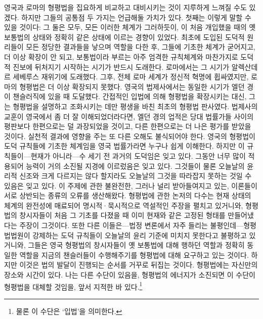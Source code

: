 영국과 로마의 형평법을 집요하게 비교하고 대비시키는 것이 지루하게 느껴질 수도
있겠다. 하지만 그들의 공통점 두 가지는 언급해둘 가치가 있다.
첫째는 이렇게 말할 수 있을 것이다:
그 둘은 모두, 모든 이러한 체계가 그러하듯이,
이 처음 개입했을 때의 옛 보통법의 상태와 정확히 같은 상태에
이르는 경향이 있었다.
최초에 도입된 도덕적 원리들이 모든 정당한 결과들을 낳으며 역할을 다한 후,
그들에 기초한 체계가 굳어지고, 더 이상 확장이 안 되고,
보통법이라 부르는 아주 엄격한 규칙체계와 마찬가지로
도덕적 진보에 뒤처지기 시작하는
시기가 반드시 도래한다.
로마에서는 그 시기가 알렉산데르 세베루스 재위기에 도래했다.
그후, 전체 로마 세계가 정신적 혁명에 휩싸였지만, 로마의 형평법은
더 이상 확장되지 못했다.
영국의 법제사에서는 동일한 시기가 엘던 경이
챈슬러직에 있을 때 도달했다.
간접적인 입법에 의해 형평법을 확장시키는 대신, 그는
형평법을 설명하고 조화시키는 데만 평생을 바친 최초의 형평법 판사였다.
법제사의 교훈이 영국에서 좀 더 잘 이해되었더라다면,
엘던 경의 업적은
당대 법률가들 사이의 평판보다
한편으로는 덜 과장되었을 것이고,
다른 한편으로는 더 나은 평가를 받았을 것이다.
실천적 결과에 영향을 주는 또 다른 오해도 불식되어야 한다.
영국의 형평법이 도덕 규칙들에 기초한 체계임을
영국 법률가라면 누구나 쉽게 이해한다.
하지만 이 규칙들이---현재가 아니라---수 세기 전 과거의 도덕임은 잊고 있다.
그동안 너무 많이 적용되어 능력이 거의 소진될 지경에 이르렀음은 잊고 있다.
그것들이 물론 오늘날의 윤리적 신조와 크게 다르지는 않다 할지라도
오늘날의 그것을 따라잡지 못하는 것일 수 있음은 잊고 있다.
이 주제에 관한 불완전한, 그러나 널리 받아들여지고 있는, 이론들이
서로 상반되는 종류의 오류를 생산해왔다.
형평법에 관한 논저의 다수는
현재 상태의 체계의 완전성에 매료되어
명시적^^b7묵시적으로 역설적인 주장을 펼치고 있거니와,
형평법의 창시자들이 처음 그 기초를 다졌을 때 이미 현재와 같은 고정된 형태를
만들어냈다는 주장이 그것이다.
또한 다른 이들은---법정 변론에서 자주 들리는 불평인데---형평법법원이
강제하는 도덕 규칙들이 오늘날의 윤리 기준에 미치지 못한다고 불평하고 있거니와,
그들은 영국 형평법의 창시자들이 옛 보통법에 대해
행하던 역할과 정확히 동일한 역할을
지금의 챈슬러들이
수행해주기를 형평법에 대해 요구하고 있는 것이다.
하지만 이것은 법의 발달이 진행되는 순서를 거꾸로 뒤집는 것이다.
형평법에는 자신만의 장소와 시간이 있다.
나는 다른 수단이 있음을,
형평법의 에너지가 소진되면 이 수단이 형평법을 대체할 것임을,
앞서 지적한 바 있다.\footnote{%
  물론 이 수단은 `입법'을 의미한다. }

